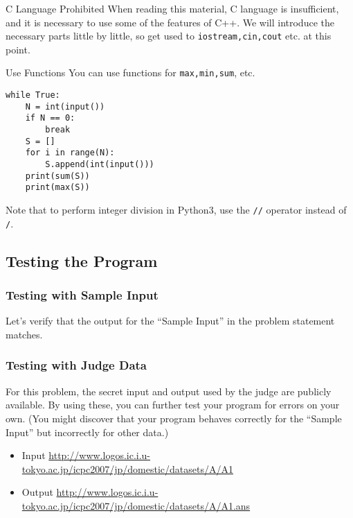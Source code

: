 \begin{warningbox}{C Language Prohibited}
  When reading this material, C language is insufficient, and it is necessary to use some of the features of C++. We will introduce the necessary parts little by little, so get used to \texttt{iostream,cin,cout} etc. at this point.
\end{warningbox}

\begin{tipsbox}{Use Functions}
  You can use functions for \texttt{max,min,sum}, etc.
\end{tipsbox}

\begin{pybox}
\begin{verbatim}
while True:
    N = int(input())
    if N == 0:
        break
    S = []
    for i in range(N):
        S.append(int(input()))
    print(sum(S))
    print(max(S))
\end{verbatim}
\end{pybox}
Note that to perform integer division in Python3, use the \texttt{//} operator instead of \texttt{/}.
\subsection{Testing the Program}

\subsubsection{Testing with Sample Input}

Let's verify that the output for the ``Sample Input'' in the problem statement matches.

\subsubsection{Testing with Judge Data}
For this problem, the secret input and output used by the judge are publicly available. By using these, you can further test your program for errors on your own. (You might discover that your program behaves correctly for the ``Sample Input'' but incorrectly for other data.)
\begin{itemize}
\item Input \url{http://www.logos.ic.i.u-tokyo.ac.jp/icpc2007/jp/domestic/datasets/A/A1}
\item Output \url{http://www.logos.ic.i.u-tokyo.ac.jp/icpc2007/jp/domestic/datasets/A/A1.ans}
\end{itemize}

